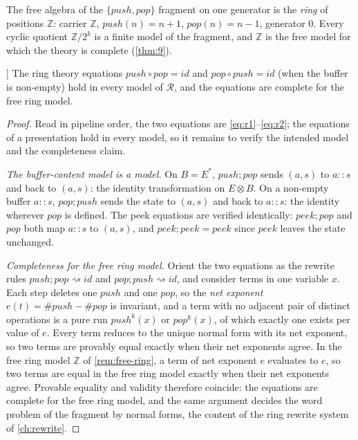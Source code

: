 \begin{remark}
\label{rem:free-ring}
The free algebra of the $\{\mathit{push}, \mathit{pop}\}$ fragment on one
generator is the \emph{ring} of positions $\mathbb{Z}$: carrier
$\mathbb{Z}$, $\mathit{push} (n) = n+1$, $\mathit{pop} (n) = n-1$, generator
$0$. Every cyclic quotient $\mathbb{Z}/2^{k}$ is a finite model of the
fragment, and $\mathbb{Z}$ is the free model for which the theory is
complete (\autoref{thm:9}).
\end{remark}

\begin{theorem}[Ring theory equations (\autoref{thm:9}) [N]]\label{thm:9}
The ring theory equations $\mathit{push}\circ\mathit{pop} = \mathit{id}$
and $\mathit{pop}\circ\mathit{push} = \mathit{id}$ (when the buffer is
non-empty) hold in every model of $\mathcal{R}$, and the equations are
complete for the free ring model.
\end{theorem}

\begin{proof}
Read in pipeline order, the two equations are \eqref{eq:r1}--\eqref{eq:r2};
the equations of a presentation hold in every model, so it remains to
verify the intended model and the completeness claim.

\emph{The buffer-content model is a model.} On $B = E^{*}$,
$\mathit{push};\mathit{pop}$ sends $(a,s)$ to $a \mathbin{::} s$ and back
to $(a,s)$: the identity transformation on $E \otimes B$. On a non-empty
buffer $a \mathbin{::} s$, $\mathit{pop};\mathit{push}$ sends the state to
$(a,s)$ and back to $a \mathbin{::} s$: the identity wherever $\mathit{pop}$
is defined. The peek equations are verified identically:
$\mathit{peek};\mathit{pop}$ and $\mathit{pop}$ both map $a \mathbin{::} s$
to $(a,s)$, and $\mathit{peek};\mathit{peek} = \mathit{peek}$ since
$\mathit{peek}$ leaves the state unchanged.

\emph{Completeness for the free ring model.} Orient the two equations as
the rewrite rules $\mathit{push};\mathit{pop} \rightsquigarrow \mathit{id}$
and $\mathit{pop};\mathit{push} \rightsquigarrow \mathit{id}$, and consider
terms in one variable $x$. Each step deletes one $\mathit{push}$ and one
$\mathit{pop}$, so the \emph{net exponent} $e (t) = \#\mathit{push} -
\#\mathit{pop}$ is invariant, and a term with no adjacent pair of distinct
operations is a pure run $\mathit{push}^{k} (x)$ or $\mathit{pop}^{k} (x)$,
of which exactly one exists per value of $e$. Every term reduces to the
unique normal form with its net exponent, so two terms are provably equal
exactly when their net exponents agree. In the free ring model
$\mathbb{Z}$ of \autoref{rem:free-ring}, a term of net exponent $e$
evaluates to $e$, so two terms are equal in the free ring model exactly
when their net exponents agree. Provable equality and validity therefore
coincide: the equations are complete for the free ring model, and the same
argument decides the word problem of the fragment by normal forms, the
content of the ring rewrite system of \autoref{ch:rewrite}.
\end{proof}

